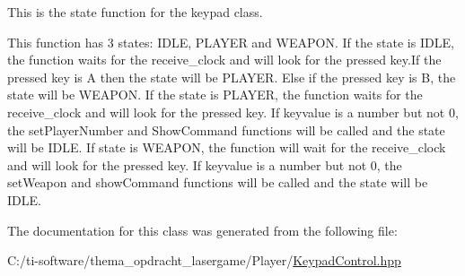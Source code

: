 This is the state function for the keypad class. 

This function has 3 states\+: I\+D\+LE, P\+L\+A\+Y\+ER and W\+E\+A\+P\+ON. If the state is I\+D\+LE, the function waits for the receive\+\_\+clock and will look for the pressed key.\+If the pressed key is A then the state will be P\+L\+A\+Y\+ER. Else if the pressed key is B, the state will be W\+E\+A\+P\+ON. If the state is P\+L\+A\+Y\+ER, the function waits for the receive\+\_\+clock and will look for the pressed key. If keyvalue is a number but not 0, the set\+Player\+Number and Show\+Command functions will be called and the state will be I\+D\+LE. If state is W\+E\+A\+P\+ON, the function will wait for the receive\+\_\+clock and will look for the pressed key. If keyvalue is a number but not 0, the set\+Weapon and show\+Command functions will be called and the state will be I\+D\+LE. 

The documentation for this class was generated from the following file\+:\begin{DoxyCompactItemize}
\item 
C\+:/ti-\/software/thema\+\_\+opdracht\+\_\+lasergame/\+Player/\mbox{\hyperlink{_keypad_control_8hpp}{Keypad\+Control.\+hpp}}\end{DoxyCompactItemize}
